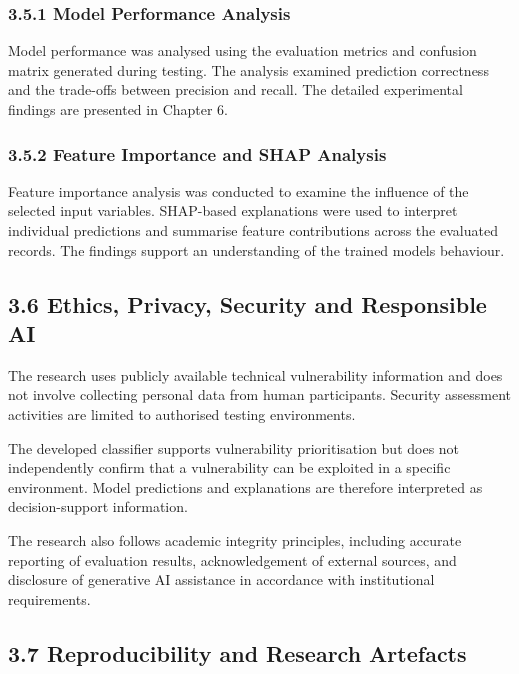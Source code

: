 \documentclass[
]{article}
\begin{document}
\hypertarget{model-performance-analysis}{%
\subsubsection{3.5.1 Model Performance
Analysis}\label{model-performance-analysis}}

Model performance was analysed using the evaluation metrics and
confusion matrix generated during testing. The analysis examined
prediction correctness and the trade-offs between precision and recall.
The detailed experimental findings are presented in Chapter 6.

\hypertarget{feature-importance-and-shap-analysis}{%
\subsubsection{3.5.2 Feature Importance and SHAP
Analysis}\label{feature-importance-and-shap-analysis}}

Feature importance analysis was conducted to examine the influence of
the selected input variables. SHAP-based explanations were used to
interpret individual predictions and summarise feature contributions
across the evaluated records. The findings support an understanding of
the trained model\textquotesingle s behaviour.

\hypertarget{ethics-privacy-security-and-responsible-ai}{%
\subsection{3.6 Ethics, Privacy, Security and Responsible
AI}\label{ethics-privacy-security-and-responsible-ai}}

The research uses publicly available technical vulnerability information
and does not involve collecting personal data from human participants.
Security assessment activities are limited to authorised testing
environments.

The developed classifier supports vulnerability prioritisation but does
not independently confirm that a vulnerability can be exploited in a
specific environment. Model predictions and explanations are therefore
interpreted as decision-support information.

The research also follows academic integrity principles, including
accurate reporting of evaluation results, acknowledgement of external
sources, and disclosure of generative AI assistance in accordance with
institutional requirements.

\hypertarget{reproducibility-and-research-artefacts}{%
\subsection{3.7 Reproducibility and Research
Artefacts}\label{reproducibility-and-research-artefacts}}
\end{document}
